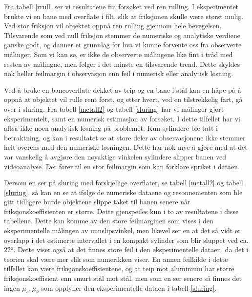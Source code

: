 \documentclass[5p]{elsarticle}
\begin{document}
	Fra tabell \ref{rrull} ser vi resultatene fra forsøket ved ren rulling. I eksperimentet brukte vi en bane med overflate i filt, slik at friksjonen skulle være størst mulig. Ved stor friksjon vil objektet oppnå ren rulling gjennom hele bevegelsen. Tilsvarende som ved null friksjon stemmer de numeriske og analytiske verdiene ganske godt, og danner et grunnlag for hva vi kunne forvente oss fra observerte målinger. Som vi kan se, er ikke de observerte målingene like fint i tråd med resten av målingne, men følger i det minste en tilsvarende trend. Dette skyldes nok heller feilmargin i observasjon enn feil i numerisk eller analytisk løsning.
	
	
	Ved å bruke en baneoverflate dekket av teip og en bane i stål kan en håpe på å oppnå at objektet vil rulle rent først, og etter hvert, ved en tilstrekkelig fart, gå over i sluring. Fra tabell \ref{metall2} og tabell \ref{sluring} har vi målinger gjort eksperimentelt, samt en numerisk estimasjon av forsøket. I dette tilfellet har vi altså ikke noen analytisk løsning på problemet. Kun sylindere ble tatt i betraktning, og kan i resultatet se at store deler av observasjonene ikke stemmer helt overens med den numeriske løsningen. Dette har nok mye å gjøre med at det var vanskelig å avgjøre den nøyaktige vinkelen sylindere slipper banen ved videoanalyse. Det fører til en stor feilmargin som kan forklare spriket i dataen.
	
	Dersom en ser på sluring med forskjellige overflater, se tabell \ref{metall2} og tabell \ref{sluring}, så kan en se at ifølge de numeriske dataene og resonnementen som ble gitt tidligere burde objektene slippe taket til banen senere når friksjonskoeffisienten er større. Dette gjenspeiles kun i to av resultatene i disse tabellene. Dette kan komme av den store feilmarginen som vises i den eksperimentelle målingen av unnslipsvinkel, men likevel ser en at det så vidt er overlapp i det estimerte intervallet i en kompakt sylinder som blir sluppet ved ca. 22$^{\text{o}}$. Dette viser også at det finnes store feil i den eksperimentelle dataen, da det i teorien skal være mer slik som numerikken viser. En annen feilkilde i dette tilfellet kan være friksjonskoeffisientene, og at teip mot aluminium har større friksjonskoeffisient enn smurt stål mot stål, men som en ser senere så finnes det ingen $\mu_s, \mu_k$ som oppfyller den eksperimentelle dataen i tabell \ref{sluring}.
	
\end{document}
